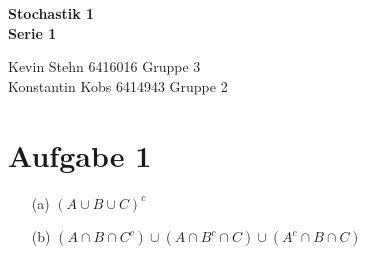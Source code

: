 \documentclass[10pt,a4paper]{article}
\begin{document}
\begin{center}
\textbf{Stochastik 1 \\ Serie 1 \\}
\end{center}

\begin{flushright}
Kevin Stehn 6416016 Gruppe 3 \\
Konstantin Kobs 6414943 Gruppe 2
\end{flushright}

\section*{Aufgabe 1}
\begin{itemize}
\item[(a)] $(A \cup B \cup C)^{c}$
\item[(b)] 
$(A \cap B \cap C^{c}) \cup (A \cap B^{c} \cap C) \cup (A^{c} \cap B \cap C)$
\end{itemize}
\end{document}
